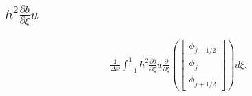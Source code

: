 \subsection{$ h^2 \frac{\partial b}{\partial \xi} u $}
\begin{multline*}
\frac{1}{\Delta x}\int_{-1 }^{1}  h^2 \frac{\partial b}{\partial \xi} u     \frac{\partial}{\partial \xi}\left(\begin{bmatrix}
\phi_{j-1/2}\\\phi_j \\\phi_{j+1/2}
\end{bmatrix} \right) d\xi.
\end{multline*}
